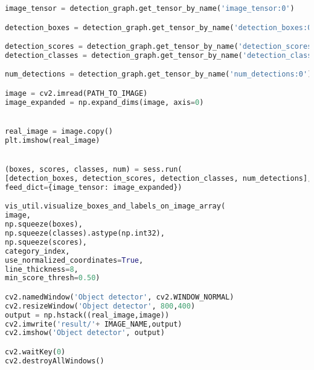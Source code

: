 \begin{appendices}
\begin{lstlisting}[language=Python, caption=Image Detection and Classification]
image_tensor = detection_graph.get_tensor_by_name('image_tensor:0')

detection_boxes = detection_graph.get_tensor_by_name('detection_boxes:0')

detection_scores = detection_graph.get_tensor_by_name('detection_scores:0')
detection_classes = detection_graph.get_tensor_by_name('detection_classes:0')

num_detections = detection_graph.get_tensor_by_name('num_detections:0')

image = cv2.imread(PATH_TO_IMAGE)
image_expanded = np.expand_dims(image, axis=0)


real_image = image.copy()
plt.imshow(real_image)


(boxes, scores, classes, num) = sess.run(
[detection_boxes, detection_scores, detection_classes, num_detections],
feed_dict={image_tensor: image_expanded})

vis_util.visualize_boxes_and_labels_on_image_array(
image,
np.squeeze(boxes),
np.squeeze(classes).astype(np.int32),
np.squeeze(scores),
category_index,
use_normalized_coordinates=True,
line_thickness=8,
min_score_thresh=0.50)

cv2.namedWindow('Object detector', cv2.WINDOW_NORMAL)
cv2.resizeWindow('Object detector', 800,400)
output = np.hstack((real_image,image))
cv2.imwrite('result/'+ IMAGE_NAME,output)
cv2.imshow('Object detector', output)

cv2.waitKey(0)
cv2.destroyAllWindows()


\end{lstlisting}





\end{appendices}